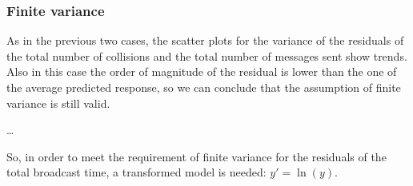 \subsubsection{Finite variance}\label{rectassumptionsvariance}

As in the previous two cases, the scatter plots for the variance of the
residuals of the total number of collisions and the total number of messages
sent show trends. Also in this case the order of magnitude of the residual is
lower than the one of the average predicted response, so we can conclude that
the assumption of finite variance is still valid.

\ldots

So, in order to meet the requirement of finite variance for the residuals of the
total broadcast time, a transformed model is needed: \(y' = \ln(y)\).

